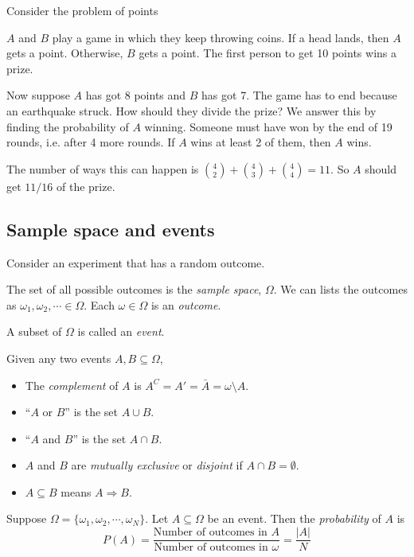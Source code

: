 \documentclass[a4paper]{article}
\begin{document}
Consider the problem of points

$A$ and $B$ play a game in which they keep throwing coins. If a head lands, then $A$ gets a point. Otherwise, $B$ gets a point. The first person to get 10 points wins a prize.

Now suppose $A$ has got 8 points and $B$ has got 7. The game has to end because an earthquake struck. How should they divide the prize? We answer this by finding the probability of $A$ winning. Someone must have won by the end of 19 rounds, i.e. after 4 more rounds. If $A$ wins at least 2 of them, then $A$ wins.

The number of ways this can happen is $\binom{4}{2} + \binom{4}{3} + \binom{4}{4} = 11$. So $A$ should get $11/16$ of the prize.

\subsection{Sample space and events}
Consider an experiment that has a random outcome.

\begin{defi}
  The set of all possible outcomes is the \emph{sample space}, $\Omega$. We can lists the outcomes as $\omega_1, \omega_2, \cdots \in \Omega$. Each $\omega \in \Omega$ is an \emph{outcome}.
\end{defi}

\begin{defi}[Event]
  A subset of $\Omega$ is called an \emph{event}.
\end{defi}

\begin{defi}
  Given any two events $A, B\subseteq \Omega$,
  \begin{itemize}
    \item The \emph{complement} of $A$ is $A^C = A' = \bar A = \omega\setminus A$.
    \item ``$A$ or $B$'' is the set $A\cup B$.
    \item ``$A$ and $B$''  is the set $A\cap B$.
    \item $A$ and $B$ are \emph{mutually exclusive} or \emph{disjoint} if $A\cap B = \emptyset$.
    \item $A\subseteq B$ means $A\Rightarrow B$.
  \end{itemize}
\end{defi}

\begin{defi}[Probability]
  Suppose $\Omega = \{\omega_1,\omega_2, \cdots, \omega_N\}$. Let $A\subseteq \Omega$ be an event. Then the \emph{probability} of $A$ is
  \[
    P(A) = \frac{\text{Number of outcomes in } A}{\text{Number of outcomes in }\omega} = \frac{|A|}{N}
  \]
\end{defi}
\end{document}
